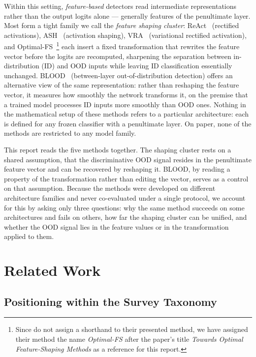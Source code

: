 \documentclass[a4paper]{article}
\begin{document}
Within this setting, \emph{feature-based} detectors read intermediate
representations rather than the output logits alone --- generally features of the penultimate layer.
 Most form a tight family we call the \emph{ feature shaping cluster}: ReAct~\citep{react} (rectified activations),
ASH~\citep{ash} (activation shaping), VRA~\citep{vra} (variational rectified
activation), and Optimal-FS~\citep{optimalfs}\footnote{Since \citet{optimalfs} do not assign a shorthand to their presented method, we have assigned their method the name \emph{Optimal-FS} after the paper's title \emph{Towards Optimal Feature-Shaping Methods} as a reference for this report.} each insert a fixed transformation that rewrites the feature
vector before the logits are recomputed, sharpening the separation between
in-distribution (ID) and OOD inputs while leaving ID classification essentially
unchanged. BLOOD~\citep{blood} (between-layer out-of-distribution detection) offers an
alternative view of the same representation: rather than reshaping the feature vector,
it measures how smoothly the network transforms it, on the premise that a trained model
processes ID inputs more smoothly than OOD ones. Nothing in the mathematical setup of
these methods refers to a particular architecture: each is defined for any frozen
classifier with a penultimate layer. On paper, none of the methods are restricted to any model family.

This report reads the five methods together. The shaping cluster rests on a shared
assumption, that the discriminative OOD signal resides in the penultimate feature
vector and can be recovered by reshaping it. BLOOD, by reading a property of the
transformation rather than editing the vector, serves as a control on that assumption.
Because the methods were developed on different architecture families and never
co-evaluated under a single protocol, we account for this by asking only three questions: why the same method succeeds
on some architectures and fails on others, how far the shaping cluster can be unified,
and whether the OOD signal lies in the feature values or in the transformation applied
to them.

\section{Related Work}
\label{related}


\subsection{Positioning within the Survey Taxonomy}
\label{subsec:taxonomy}
\end{document}
